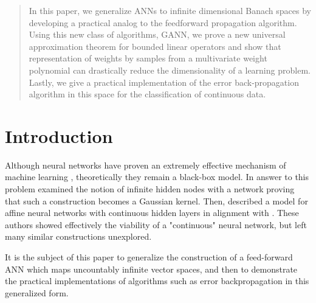 \documentclass{article}
\begin{document}
 


\begin{abstract} 
In this paper, we generalize ANNs to infinite dimensional Banach spaces by developing a
practical analog to the feedforward propagation algorithm. Using this new class of algorithms, GANN, 
we prove a new universal approximation theorem for bounded linear operators and show that representation
of weights by samples from a multivariate weight polynomial can drastically reduce the dimensionality of a
learning problem. Lastly, we give a practical implementation of the error back-propagation algorithm in this
space for the classification of continuous data.
\end{abstract} 


\section{Introduction}
Although neural networks have proven an extremely effective mechanism of machine learning \cite{mlsurvey}, theoretically they remain a black-box model.  In answer to this problem \cite{neal} examined the notion of infinite hidden nodes with a network proving that such a construction becomes a Gaussian kernel. Then, \cite{roux} described a model for affine neural networks with continuous hidden layers in alignment with \cite{neal}. These authors showed effectively the viability of a "continuous" neural network, but left many similar constructions unexplored. 

It is the subject of this paper to generalize the construction of a feed-forward ANN which maps uncountably infinite vector spaces, and then to demonstrate the practical implementations of algorithms such as error backpropagation in this generalized form.
\end{document}
